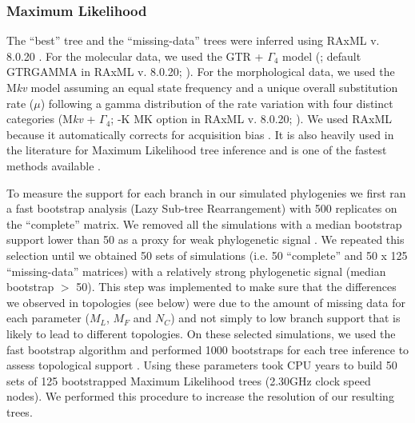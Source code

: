 \documentclass[12pt,letterpaper]{article}
\begin{document}
\subsubsection{Maximum Likelihood}
The ``best'' tree and the ``missing-data'' trees were inferred using RAxML v. 8.0.20 \citep{Stamatakis21012014}. For the molecular data, we used the GTR + $\Gamma_4$ model (\citealp{tavare1986}; default GTRGAMMA in RAxML v. 8.0.20; \citealp{Stamatakis21012014}).
For the morphological data, we used the M\textit{kv} model \citep{lewisa2001} assuming an equal state frequency and a unique overall substitution rate ($\mu$) following a gamma distribution of the rate variation with four distinct categories (M\textit{kv} + $\Gamma_4$; -K MK option in RAxML v. 8.0.20; \citealp{Stamatakis21012014}).
We used RAxML because it automatically corrects for acquisition bias \citep{lewisa2001}. It is also heavily used in the literature for Maximum Likelihood tree inference \citep[e.g.][]{rouresite-specific2011,Bogdanowicz2012,springermacroevolutionary2012,O'Leary08022013,kellymolecular2014} and is one of the fastest methods available \citep{Stamatakis01102008}. 

To measure the support for each branch in our simulated phylogenies we first ran a fast bootstrap analysis (Lazy Sub-tree Rearrangement) with 500 replicates on the ``complete'' matrix.
We removed all the simulations with a median bootstrap support lower than 50 as a proxy for weak phylogenetic signal \citep{zanderminimal2004}.
We repeated this selection until we obtained 50 sets of simulations (i.e. 50 ``complete'' and 50 x 125 ``missing-data'' matrices) with a relatively strong phylogenetic signal (median bootstrap $>$ 50).
This step was implemented to make sure that the differences we observed in topologies (see below) were due to the amount of missing data for each parameter ($M_L$, $M_F$ and $N_C$) and not simply to low branch support that is likely to lead to different topologies.
On these selected simulations, we used the fast bootstrap algorithm and performed 1000 bootstraps for each tree inference to assess topological support \citep{pattengale2010many}.
Using these parameters took  CPU years to build 50 sets of 125 bootstrapped Maximum Likelihood trees (2.30GHz clock speed nodes). We performed this procedure to increase the resolution of our resulting trees. 
\end{document}
